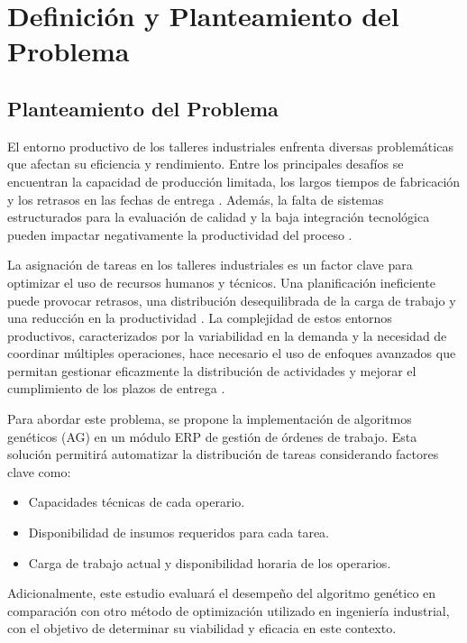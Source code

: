 \chapter{Definición y Planteamiento del Problema}

\section{Planteamiento del Problema}

El entorno productivo de los talleres industriales enfrenta diversas problemáticas que afectan su eficiencia y rendimiento. Entre los principales desafíos se encuentran la capacidad de producción limitada, los largos tiempos de fabricación y los retrasos en las fechas de entrega \cite{ref7}. Además, la falta de sistemas estructurados para la evaluación de calidad y la baja integración tecnológica pueden impactar negativamente la productividad del proceso \cite{ref7}.  

La asignación de tareas en los talleres industriales es un factor clave para optimizar el uso de recursos humanos y técnicos. Una planificación ineficiente puede provocar retrasos, una distribución desequilibrada de la carga de trabajo y una reducción en la productividad \cite{ref8}. La complejidad de estos entornos productivos, caracterizados por la variabilidad en la demanda y la necesidad de coordinar múltiples operaciones, hace necesario el uso de enfoques avanzados que permitan gestionar eficazmente la distribución de actividades y mejorar el cumplimiento de los plazos de entrega \cite{ref8}.  

Para abordar este problema, se propone la implementación de algoritmos genéticos (AG) en un módulo ERP de gestión de órdenes de trabajo. Esta solución permitirá automatizar la distribución de tareas considerando factores clave como:

\begin{itemize}
    \item Capacidades técnicas de cada operario.
    \item Disponibilidad de insumos requeridos para cada tarea.
    \item Carga de trabajo actual y disponibilidad horaria de los operarios.
\end{itemize}

Adicionalmente, este estudio evaluará el desempeño del algoritmo genético en comparación con otro método de optimización utilizado en ingeniería industrial, con el objetivo de determinar su viabilidad y eficacia en este contexto.


